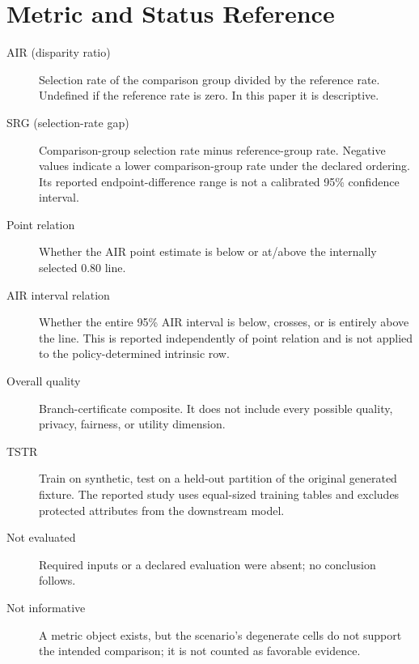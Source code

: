 \section{Metric and Status Reference}

\begin{description}
  \item[AIR (disparity ratio)] Selection rate of the comparison group divided by the reference
  rate. Undefined if the reference rate is zero. In this paper it is descriptive.
  \item[SRG (selection-rate gap)] Comparison-group selection rate minus reference-group rate.
  Negative values indicate a lower comparison-group rate under the declared ordering. Its reported
  endpoint-difference range is not a calibrated 95\% confidence interval.
  \item[Point relation] Whether the AIR point estimate is below or at/above the internally selected
  0.80 line.
  \item[AIR interval relation] Whether the entire 95\% AIR interval is below, crosses, or is
  entirely above the line. This is reported independently of point relation and is not applied to
  the policy-determined intrinsic row.
  \item[Overall quality] Branch-certificate composite. It does not include every possible quality,
  privacy, fairness, or utility dimension.
  \item[TSTR] Train on synthetic, test on a held-out partition of the original generated fixture.
  The reported study uses equal-sized training tables and excludes protected attributes from the
  downstream model.
  \item[Not evaluated] Required inputs or a declared evaluation were absent; no conclusion follows.
  \item[Not informative] A metric object exists, but the scenario's degenerate cells do not support
  the intended comparison; it is not counted as favorable evidence.
\end{description}
